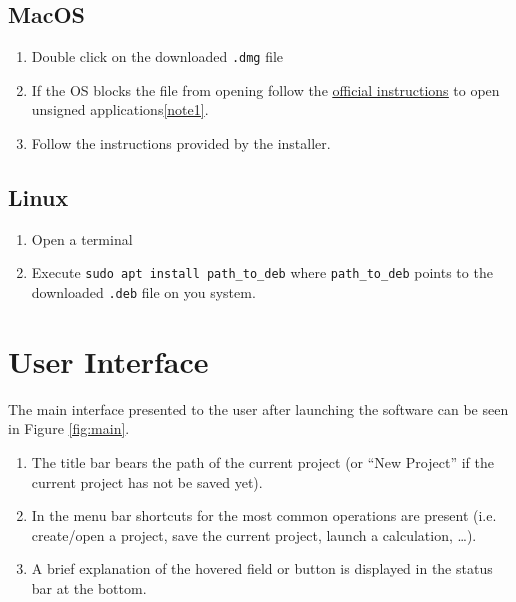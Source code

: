 \documentclass[a4paper, 12pt]{article}
\newcommand*\circled[1]{\kern-2.5em%
  \put(0,4){\color{red}\circle*{18}}\put(0,4){\circle{16}}%
  \put(-4,0){\color{white}\bfseries\large#1}~~}
\begin{document}
\subsection{MacOS}
\begin{enumerate}
    \item Double click on the downloaded \verb|.dmg| file
    \item If the OS blocks the file from opening follow the \href{https://support.apple.com/it-it/guide/mac-help/mh40616/mac}{\underline{official instructions}} to open unsigned applications\cref{note1}.
    \item Follow the instructions provided by the installer.
\end{enumerate}

\subsection{Linux}
\begin{enumerate}
    \item Open a terminal
    \item Execute \verb|sudo apt install path_to_deb| where \verb|path_to_deb| points to the downloaded \verb|.deb| file on you system.
\end{enumerate}

\newpage


\section{User Interface}
\label{sec:interface}

The main interface presented to the user after launching the software can be seen in Figure \ref*{fig:main}.

\begin{enumerate}[label=\protect\circled{\arabic*}]
    \item The title bar bears the path of the current project (or ``New Project'' if the current project has not be saved yet).
    \item In the menu bar shortcuts for the most common operations are present (i.e. create/open a project, save the current project, launch a calculation, \ldots).
    \item A brief explanation of the hovered field or button is displayed in the status bar at the bottom.
\end{enumerate}
\end{document}
